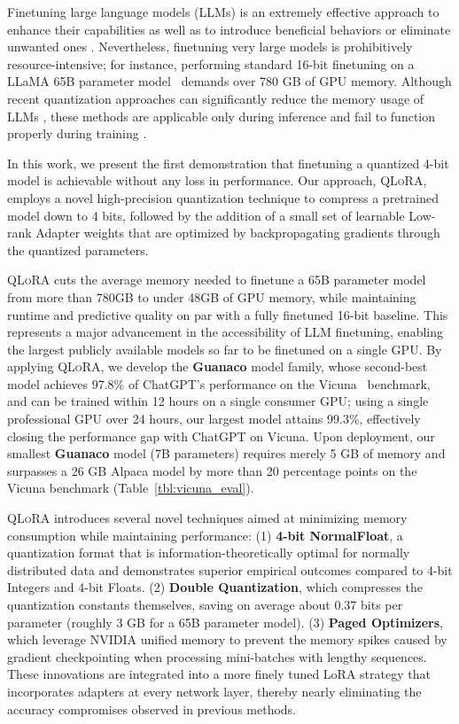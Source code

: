 Finetuning large language models (LLMs) is an extremely effective approach to enhance their capabilities \citep{min2021metaicl, wei2021finetuned, ouyang2022training, wang2022super, wang2022self, liu2022few} as well as to introduce beneficial behaviors or eliminate unwanted ones \citep{ouyang2022training,askell2021general,bai2022training}. Nevertheless, finetuning very large models is prohibitively resource-intensive; for instance, performing standard 16-bit finetuning on a LLaMA 65B parameter model~\citep{touvron2023llama} demands over 780 GB of GPU memory. Although recent quantization approaches can significantly reduce the memory usage of LLMs \citep{dettmers2022llm, dettmers2022case, frantar2022gptq, xiao2022smoothquant}, these methods are applicable only during inference and fail to function properly during training \citep{wortsman2023stable}.

In this work, we present the first demonstration that finetuning a quantized 4-bit model is achievable without any loss in performance. Our approach, \textsc{QLoRA}, employs a novel high-precision quantization technique to compress a pretrained model down to 4 bits, followed by the addition of a small set of learnable Low-rank Adapter weights \citep{hu2021lora} that are optimized by backpropagating gradients through the quantized parameters.

\textsc{QLoRA} cuts the average memory needed to finetune a 65B parameter model from more than 780GB to under 48GB of GPU memory, while maintaining runtime and predictive quality on par with a fully finetuned 16-bit baseline. This represents a major advancement in the accessibility of LLM finetuning, enabling the largest publicly available models so far to be finetuned on a single GPU. By applying \textsc{QLoRA}, we develop the \textbf{Guanaco} model family, whose second-best model achieves 97.8\% of ChatGPT’s performance on the Vicuna~\citep{vicuna2023} benchmark, and can be trained within 12 hours on a single consumer GPU; using a single professional GPU over 24 hours, our largest model attains 99.3\%, effectively closing the performance gap with ChatGPT on Vicuna. Upon deployment, our smallest \textbf{Guanaco} model (7B parameters) requires merely 5 GB of memory and surpasses a 26 GB Alpaca model by more than 20 percentage points on the Vicuna benchmark (Table~\ref{tbl:vicuna_eval}).

\textsc{QLoRA} introduces several novel techniques aimed at minimizing memory consumption while maintaining performance: (1) \textbf{4-bit NormalFloat}, a quantization format that is information-theoretically optimal for normally distributed data and demonstrates superior empirical outcomes compared to 4-bit Integers and 4-bit Floats. (2) \textbf{Double Quantization}, which compresses the quantization constants themselves, saving on average about 0.37 bits per parameter (roughly 3 GB for a 65B parameter model). (3) \textbf{Paged Optimizers}, which leverage NVIDIA unified memory to prevent the memory spikes caused by gradient checkpointing when processing mini-batches with lengthy sequences. These innovations are integrated into a more finely tuned LoRA strategy that incorporates adapters at every network layer, thereby nearly eliminating the accuracy compromises observed in previous methods.

